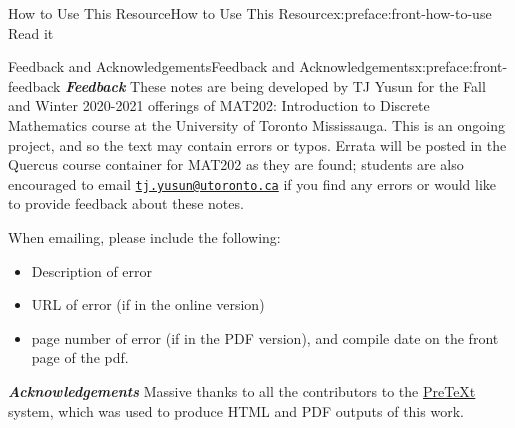 \documentclass[oneside,10pt,]{book}
\newcommand{\mono}[1]{\texttt{#1}}
\newcommand{\alert}[1]{\textbf{\textit{#1}}}
\numberwithin{equation}{section}
\begin{document}
%
%
\typeout{************************************************}
\typeout{************************************************}
%
\begin{preface}{How to Use This Resource}{}{How to Use This Resource}{}{}{x:preface:front-how-to-use}
Read it%
\end{preface}
%
%
\typeout{************************************************}
\typeout{************************************************}
%
\begin{preface}{Feedback and Acknowledgements}{}{Feedback and Acknowledgements}{}{}{x:preface:front-feedback}
\alert{Feedback} These notes are being developed by TJ Yusun for the Fall and Winter 2020-2021 offerings of MAT202: Introduction to Discrete Mathematics course at the University of Toronto Mississauga. This is an ongoing project, and so the text may contain errors or typos. Errata will be posted in the Quercus course container for MAT202 as they are found; students are also encouraged to email \href{mailto:tj.yusun@utoronto.ca?subject=202notes-pretext}{\mono{tj.yusun@utoronto.ca}} if you find any errors or would like to provide feedback about these notes.%
\par
When emailing, please include the following:%
\begin{itemize}[label=\textbullet]
\item{}Description of error%
\item{}URL of error (if in the online version)%
\item{}page number of error (if in the PDF version), and compile date on the front page of the pdf.%
\end{itemize}
%
\par
\alert{Acknowledgements} Massive thanks to all the contributors to the \href{https://pretextbook.org/}{PreTeXt} system, which was used to produce HTML and PDF outputs of this work.%
\end{preface}
\setcounter{tocdepth}{1}
\renewcommand*\contentsname{Contents}
\tableofcontents
\mainmatter
%
%
\typeout{************************************************}
\typeout{************************************************}
%
\end{document}
